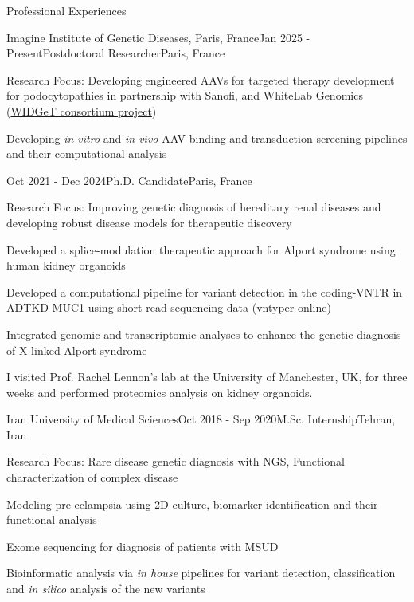 \documentclass[
	11pt, %
]{resume} %
\begin{document}

\begin{rSection}{Professional Experiences}

	\begin{rSubsection}{Imagine Institute of Genetic Diseases, Paris, France}{Jan 2025 - Present}{Postdoctoral Researcher}{Paris, France}
		\item Research Focus: Developing engineered AAVs for targeted therapy development for podocytopathies in partnership with Sanofi, and WhiteLab Genomics (\href{https://www.institutimagine.org/en/sanofi-whitelab-genomics-target-laboratory-nantes-university-and-institut-imagine-launch-widget}{WIDGeT consortium project})
		\item Developing \textit{in vitro} and \textit{in vivo} AAV binding and transduction screening pipelines and their computational analysis
	\end{rSubsection}


	\begin{rSubsection}{}{Oct 2021 - Dec 2024}{Ph.D. Candidate}{Paris, France}
		\item Research Focus: Improving genetic diagnosis of hereditary renal diseases and developing robust disease models for therapeutic discovery
		\item Developed a splice-modulation therapeutic approach for Alport syndrome using human kidney organoids
		\item Developed a computational pipeline for variant detection in the coding-VNTR in ADTKD-MUC1 using short-read sequencing data (\href{https://vntyper.org/}{vntyper-online})
		\item Integrated genomic and transcriptomic analyses to enhance the genetic diagnosis of X-linked Alport syndrome
		\item I visited Prof. Rachel Lennon's lab at the University of Manchester, UK, for three weeks and performed proteomics analysis on kidney organoids.	
	\end{rSubsection}


	\begin{rSubsection}{Iran University of Medical Sciences}{Oct 2018 - Sep 2020}{M.Sc. Internship}{Tehran, Iran}
		\item Research Focus: Rare disease genetic diagnosis with NGS, Functional characterization of complex disease
		\item Modeling pre-eclampsia using 2D culture, biomarker identification and their functional analysis
		\item Exome sequencing for diagnosis of patients with MSUD
		\item Bioinformatic analysis via \textit{in house} pipelines for variant detection, classification and \textit{in silico} analysis of the new variants
	\end{rSubsection}


\end{rSection}
\end{document}

